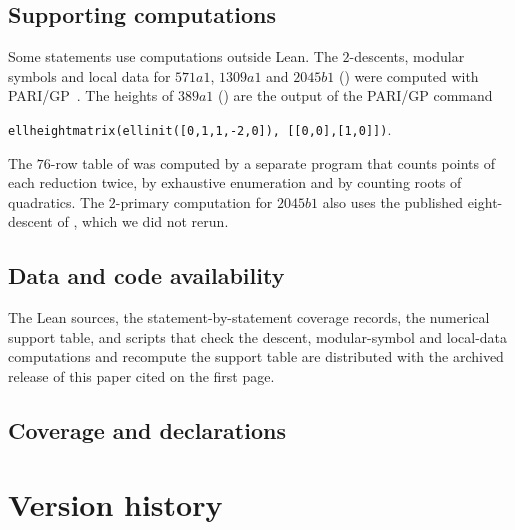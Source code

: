 \subsection*{Supporting computations}

Some statements use computations outside Lean.  The $2$-descents,
modular symbols and local data for $571a1$, $1309a1$ and $2045b1$
() were computed with
PARI/GP~\citep{PARI2023}.  The heights of $389a1$
() are the output of the PARI/GP command
\begin{center}
\texttt{ellheightmatrix(ellinit([0,1,1,-2,0]), [[0,0],[1,0]])}.
\end{center}
The
$76$-row table of  was computed by
a separate program that counts points of each reduction twice, by
exhaustive enumeration and by counting roots of quadratics.  The
$2$-primary computation for $2045b1$ also uses the published
eight-descent of \citet[proof of Theorem~7.1]{Miller2011}, which we did
not rerun.

\subsection*{Data and code availability}

The Lean sources, the statement-by-statement coverage records, the
numerical support table, and scripts that check the descent,
modular-symbol and local-data computations and recompute the support
table are distributed with the archived release of this paper cited on
the first page.

\subsection*{Coverage and declarations}





\section{Version history}\label{app:version-history}

